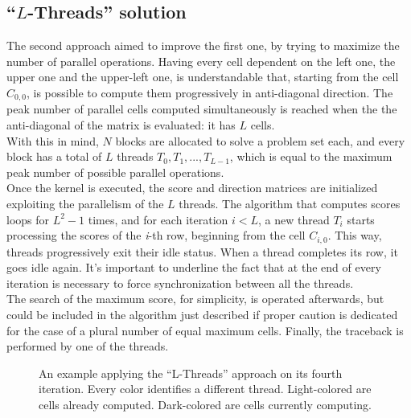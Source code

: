\documentclass{article}
\begin{document}
\subsection{``\(L\)-Threads'' solution}
\noindent
The second approach aimed to improve the first one, by trying to maximize the number of parallel operations. Having every cell dependent on the left one, the upper one and the upper-left one, is understandable that, starting from the cell \(C_{0,0}\), is possible to compute them progressively in anti-diagonal direction. The peak number of parallel cells computed simultaneously is reached when the the anti-diagonal of the matrix is evaluated: it has \(L\) cells.\\
With this in mind, \(N\) blocks are allocated to solve a problem set each, and every block has a total of \(L\) threads \(T_0, T_1, ... , T_{L-1}\), which is equal to the maximum peak number of possible parallel operations.\\
Once the kernel is executed, the score and direction matrices are initialized exploiting the parallelism of the \(L\) threads.
The algorithm that computes scores loops for \(L^2-1\) times, and for each iteration \(i<L\), a new thread \(T_i\) starts processing the scores of the \textit{i}-th row, beginning from the cell  \(C_{i,0}\). This way, threads progressively exit their idle status. When a thread completes its row, it goes idle again. It's important to underline the fact that at the end of every iteration is necessary to force synchronization between all the threads.\\
The search of the maximum score, for simplicity, is operated afterwards, but could be included in the algorithm just described if proper caution is dedicated for the case of a plural number of equal maximum cells.
Finally, the traceback is performed by one of the threads.


\begin{figure}[H]
\centering

\captionsetup{justification=centering}
\caption{\label{fig_L-threads}An example applying the ``L-Threads'' approach on its fourth iteration. Every color identifies a different thread. Light-colored are cells already computed. Dark-colored are cells currently computing.}
\end{figure}
\end{document}

